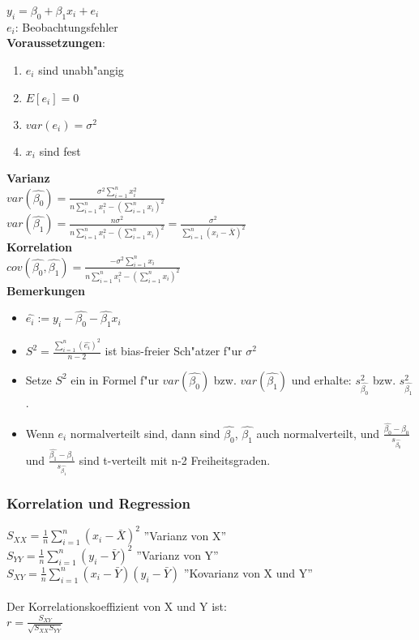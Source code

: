 \documentclass[10pt, a4paper, twocolumn]{scrartcl}
\begin{document}
$y_i=\beta_0+\beta_1 x_i+e_i$\\
$e_i$: Beobachtungsfehler\\

\textbf{Voraussetzungen}:
\begin{enumerate}
 \item $e_i$ sind unabh"angig
 \item $E[e_i]=0$
 \item $var(e_i)=\sigma^2$
 \item $x_i$ sind fest
\end{enumerate}

\textbf{Varianz}\\
$var(\hat{\beta_0})=\frac{\sigma^2\sum\limits^n_{i=1}x_i^2}{n\sum\limits^n_{i=1}x_i^2-(\sum\limits^n_{i=1}x_i)^2}$\\
$var(\hat{\beta_1})=\frac{n\sigma^2}{n\sum\limits^n_{i=1}x_i^2-(\sum\limits^n_{i=1}x_i)^2}=\frac{\sigma^2}{\sum\limits^n_{i=1}(x_i-\bar{X})^2}$\\


\textbf{Korrelation}\\
$cov(\hat{\beta_0},\hat{\beta_1})=\frac{-\sigma^2\sum\limits^n_{i=1}x_i}{n\sum\limits^n_{i=1}x_i^2-(\sum\limits^n_{i=1}x_i)^2}$\\

\textbf{Bemerkungen}
\begin{itemize}
 \item $\hat{e_i}:=y_i-\hat{\beta_0}-\hat{\beta_1}x_i$\\
 \item $S^2=\frac{\sum\limits^n_{i=1}(\hat{e_i})^2}{n-2}$ ist bias-freier Sch"atzer f"ur $\sigma^2$
 \item Setze $S^2$ ein in Formel f"ur $var(\hat{\beta_0})$ bzw. $var(\hat{\beta_1})$ und erhalte: $s_{\hat{\beta_0}}^2$ bzw. $s_{\hat{\beta_1}}^2$.
 \item Wenn $e_i$ normalverteilt sind, dann sind $\hat{\beta_0}$, $\hat{\beta_1}$ auch normalverteilt, und $\frac{\hat{\beta_0}-\beta_0}{s_{\hat{\beta_0}}}$ und $\frac{\hat{\beta_1}-\beta_1}{s_{\hat{\beta_1}}}$ sind t-verteilt mit n-2 Freiheitsgraden.
\end{itemize}

\subsubsection{Korrelation und Regression}

$S_{XX}=\frac{1}{n}\sum\limits^n_{i=1}(x_i-\bar{X})^2$ ''Varianz von X''\\
$S_{YY}=\frac{1}{n}\sum\limits^n_{i=1}(y_i-\bar{Y})^2$ ''Varianz von Y''\\
$S_{XY}=\frac{1}{n}\sum\limits^n_{i=1}(x_i-\bar{Y})(y_i-\bar{Y})$ ''Kovarianz von X und Y''\\\\

Der Korrelationskoeffizient von X und Y ist:\\
$r=\frac{S_{XY}}{\sqrt{S_{XX}S_{YY}}}$
\end{document}

